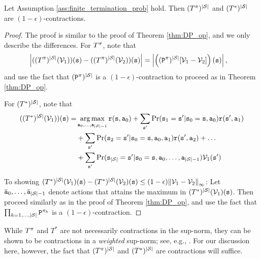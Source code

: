 \begin{theorem}
    Let Assumption \ref{ass:finite_termination_prob} hold. Then $(T^{\pi})^{|\mathcal{S}|}$ and $(T^*)^{|\mathcal{S}|}$ are $(1-\epsilon)$-contractions.
\end{theorem}
\begin{proof}
The proof is similar to the proof of Theorem \ref{thm:DP_op}, and we only describe the differences. For $T^\pi$, note that 
    \begin{align*}
    \left| ((T^{\pi})^{|\mathcal{S}|} (\mathcal{V}_1))({\tt s}) - ((T^{\pi})^{|\mathcal{S}|} (\mathcal{V}_2))({\tt s}) \right| &= \left| \left(({\tt P}^\pi)^{|\mathcal{S}|}[\mathcal{V}_1 - \mathcal{V}_2]\right)({\tt s})  \right|,
    \end{align*}
and use the fact that $({\tt P}^\pi)^{|\mathcal{S}|}$ is a $(1-\epsilon)$-contraction to proceed as in Theorem \ref{thm:DP_op}.

For $(T^*)^{|\mathcal{S}|}$, note that
\begin{equation*}
\begin{split}
    ((T^*)^{|\States|}(\Value_1))(\state) = &\argmax_{\action_0,\dots,\action_{|\States|-1}} \reward(\state,\action_0) + \sum_{\state'}\Pr(\state_1=\state'|\state_0=\state,\action_0)\reward(\state',\action_1) \\
    &+ \sum_{\state'}\Pr(\state_2=\state'|\state_0=\state,\action_0,\action_1)\reward(\state',\action_2) + \dots \\
    &+ \sum_{\state'}\Pr(\state_{|\States|}=\state'|\state_0=\state,\action_0,\dots,\action_{|\States|-1})\Value_1(\state') 
\end{split}
\end{equation*}

To showing $(T^*)^{|\mathcal{S}|}({\mathcal{V}_1})({\tt s}) - (T^*)^{|\mathcal{S}|}({\mathcal{V}_2})({\tt s})
\le (1-\epsilon) {\left\| {{\mathcal{V}_1} - {\mathcal{V}_2}} \right\|_\infty }$:
Let $\bar {{\tt a}}_0,\dots,\bar {{\tt a}}_{|\mathcal{S}|-1}$ denote actions that attains the maximum in
$(T^*)^{|\mathcal{S}|}({\mathcal{V}_1})({\tt s})$.
 Then proceed similarly as in the proof of Theorem \ref{thm:DP_op}, and use the fact that $\prod_{k=1,\dots,|\mathcal{S}|} {\tt P}^{\pi_k}$ is a $(1-\epsilon)$-contraction.
\end{proof}

\begin{remark}
    While $T^{\pi}$ and $T^*$ are not necessarily contractions in the sup-norm, they can be shown to be contractions in a \textit{weighted} sup-norm; see, e.g., \cite{Bertsekas05}. For our discussion here, however, the fact that $(T^{\pi})^{|\mathcal{S}|}$ and $(T^*)^{|\mathcal{S}|}$ are contractions will suffice.
\end{remark}

